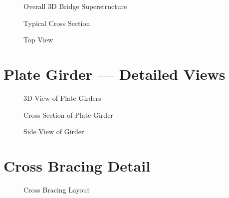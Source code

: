 \documentclass[12pt,a4paper]{report}
\numberwithin{figure}{chapter}
\begin{document}
\begin{figure}[H]
\centering
{}
\caption{Overall 3D Bridge Superstructure}
\label{fig:bridge-3d}
\end{figure}


\begin{figure}[H]
\centering
{}
\caption{Typical Cross Section}
\label{fig:cross-section}
\end{figure}


\begin{figure}[H]
\centering
{}
\caption{Top View}
\label{fig:top-view}
\end{figure}


\section{Plate Girder --- Detailed Views}
\label{sec:girder-views}

\begin{figure}[H]
\centering
{}
\caption{3D View of Plate Girders}
\label{fig:girder-3d}
\end{figure}


\begin{figure}[H]
\centering
{}
\caption{Cross Section of Plate Girder}
\label{fig:girder-xsec}
\end{figure}


\begin{figure}[H]
\centering
{}
\caption{Side View of Girder}
\label{fig:girder-side}
\end{figure}


\section{Cross Bracing Detail}
\label{sec:bracing-detail}

\begin{figure}[H]
\centering
{}
\caption{Cross Bracing Layout}
\label{fig:cb-layout}
\end{figure}
\end{document}
